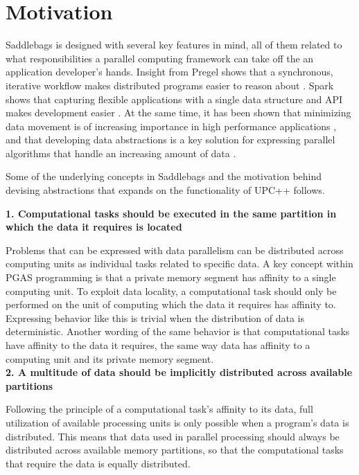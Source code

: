 \documentclass{uit-report}
\begin{document}
\section{Motivation}
Saddlebags is designed with several key features in mind, all of them related to what responsibilities a parallel computing framework can take off the an application developer's hands. Insight from Pregel shows that a synchronous, iterative workflow makes distributed programs easier to reason about \cite{pregel}. Spark shows that capturing flexible applications with a single data structure and API makes development easier \cite{sparkarticle}. At the same time, it has been shown that minimizing data movement is of increasing importance in high performance applications \cite{abstractionslocality}, and that developing data  abstractions is a key solution for expressing parallel algorithms that handle an increasing amount of data \cite{hall2013rethinking}.

Some of the underlying concepts in Saddlebags and the motivation behind devising abstractions that expands on the functionality of UPC++ follows.

\hspace{4ex} \textbf{1. Computational tasks should be executed in the same partition in which the data it requires is located}

Problems that can be expressed with data parallelism \cite{data_parallelism} can be distributed across computing units as individual tasks related to specific data. A key concept within PGAS programming is that a private memory segment has affinity to a single computing unit. To exploit data locality, a computational task should only be performed on the unit of computing which the data it requires has affinity to. Expressing behavior like this is trivial when the distribution of data is deterministic. Another wording of the same behavior is that computational tasks have affinity to the data it requires, the same way data has affinity to a computing unit and its private memory segment.
\\

\hspace{4ex} \textbf{2. A multitude of data should be implicitly distributed across available partitions}

Following the principle of a computational task's affinity to its data, full utilization of available processing units is only possible when a program's data is distributed. This means that data used in parallel processing should always be distributed across available memory partitions, so that the computational tasks that require the data is equally distributed.
\\	
\end{document}
